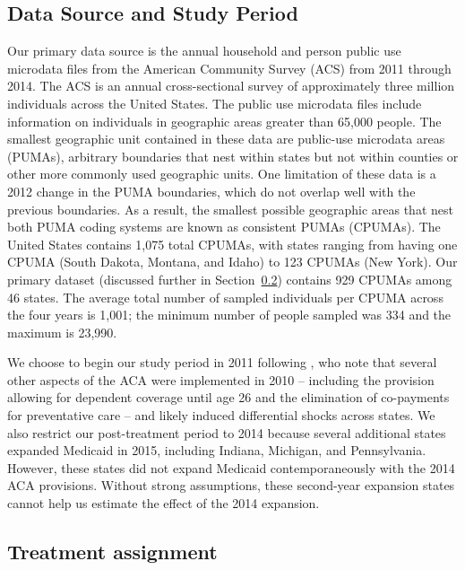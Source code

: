 \documentclass[aoas]{imsart}
\theoremstyle{plain}
\theoremstyle{remark}
\begin{document}
\subsection{Data Source and Study Period}

Our primary data source is the annual household and person public use microdata files from the American Community Survey (ACS) from 2011 through 2014. The ACS is an annual cross-sectional survey of approximately three million individuals across the United States. The public use microdata files include information on individuals in geographic areas greater than 65,000 people. The smallest geographic unit contained in these data are public-use microdata areas (PUMAs), arbitrary boundaries that nest within states but not within counties or other more commonly used geographic units. One limitation of these data is a 2012 change in the PUMA boundaries, which do not overlap well with the previous boundaries. As a result, the smallest possible geographic areas that nest both PUMA coding systems are known as consistent PUMAs (CPUMAs). The United States contains 1,075 total CPUMAs, with states ranging from having one CPUMA (South Dakota, Montana, and Idaho) to 123 CPUMAs (New York). Our primary dataset (discussed further in Section~\ref{sssec:txassign}) contains 929 CPUMAs among 46 states. The average total number of sampled individuals per CPUMA across the four years is 1,001; the minimum number of people sampled was 334 and the maximum is 23,990.

We choose to begin our study period in 2011 following \cite{courtemanche2017early}, who note that several other aspects of the ACA were implemented in 2010 -- including the provision allowing for dependent coverage until age 26 and the elimination of co-payments for preventative care -- and likely induced differential shocks across states. We also restrict our post-treatment period to 2014 because several additional states expanded Medicaid in 2015, including Indiana, Michigan, and Pennsylvania. However, these states did not expand Medicaid contemporaneously with the 2014 ACA provisions. Without strong assumptions, these second-year expansion states cannot help us estimate the effect of the 2014 expansion. 

\subsection{Treatment assignment} \label{sssec:txassign}
\end{document}
